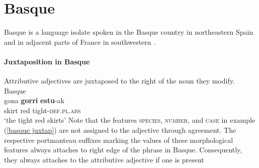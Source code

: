 \section{Basque}
Basque is a language isolate spoken in the Basque country in northeastern Spain and in adjacent parts of France in southwestern . 

\paragraph*{Juxtaposition in Basque}
Attributive adjectives are juxtaposed to the right of the noun they modify.
\ea
\label{basque juxtap}
\rm{Basque \citep[81]{saltarelli1988}}\\
\gll	gona \textbf{gorri} \textbf{estu}-ak\\
	skirt red tight-\textsc{def.pl.abs}\\
\glt	‘the tight red skirts’
\z
Note that the features \textsc{species}, \textsc{number}, and \textsc{case} in example (\ref{basque juxtap}) are not assigned to the adjective through agreement. The respective portmanteau suffixes marking the values of these morphological features always attaches to right edge of the phrase in Basque. Consequently, they always attaches to the attributive adjective if one is present \cite[171]{hualde-etal2003}
